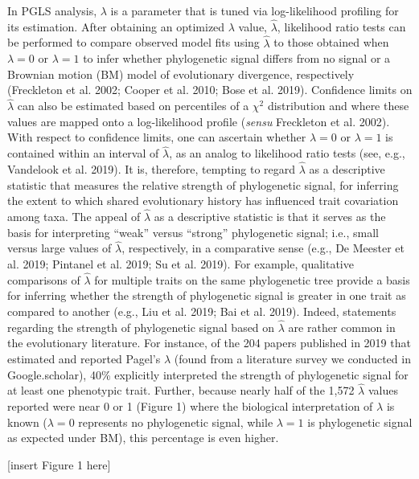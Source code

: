 \documentclass[
]{article}
\begin{document}
In PGLS analysis, \(\lambda\) is a parameter that is tuned via
log-likelihood profiling for its estimation. After obtaining an
optimized \(\lambda\) value, \(\hat{\lambda}\), likelihood ratio tests
can be performed to compare observed model fits using \(\hat{\lambda}\)
to those obtained when \(\lambda=0\) or \(\lambda=1\) to infer whether
phylogenetic signal differs from no signal or a Brownian motion (BM)
model of evolutionary divergence, respectively (Freckleton et al. 2002;
Cooper et al. 2010; Bose et al. 2019). Confidence limits on
\(\hat{\lambda}\) can also be estimated based on percentiles of a
\(\chi^2\) distribution and where these values are mapped onto a
log-likelihood profile (\emph{sensu} Freckleton et al. 2002). With
respect to confidence limits, one can ascertain whether \(\lambda=0\) or
\(\lambda=1\) is contained within an interval of \(\hat{\lambda}\), as
an analog to likelihood ratio tests (see, e.g., Vandelook et al. 2019).
It is, therefore, tempting to regard \(\hat{\lambda}\) as a descriptive
statistic that measures the relative strength of phylogenetic signal,
for inferring the extent to which shared evolutionary history has
influenced trait covariation among taxa. The appeal of \(\hat{\lambda}\)
as a descriptive statistic is that it serves as the basis for
interpreting ``weak'' versus ``strong'' phylogenetic signal; i.e., small
versus large values of \(\hat{\lambda}\), respectively, in a comparative
sense (e.g., De Meester et al. 2019; Pintanel et al. 2019; Su et al.
2019). For example, qualitative comparisons of \(\hat{\lambda}\) for
multiple traits on the same phylogenetic tree provide a basis for
inferring whether the strength of phylogenetic signal is greater in one
trait as compared to another (e.g., Liu et al. 2019; Bai et al. 2019).
Indeed, statements regarding the strength of phylogenetic signal based
on \(\hat{\lambda}\) are rather common in the evolutionary literature.
For instance, of the 204 papers published in 2019 that estimated and
reported Pagel's \(\lambda\) (found from a literature survey we
conducted in Google.scholar), 40\% explicitly interpreted the strength
of phylogenetic signal for at least one phenotypic trait. Further,
because nearly half of the 1,572 \(\hat{\lambda}\) values reported were
near 0 or 1 (Figure 1) where the biological interpretation of
\(\lambda\) is known (\(\lambda=0\) represents no phylogenetic signal,
while \(\lambda=1\) is phylogenetic signal as expected under BM), this
percentage is even higher. \hfill\break

{[}insert Figure 1 here{]} \hfill\break
\end{document}
